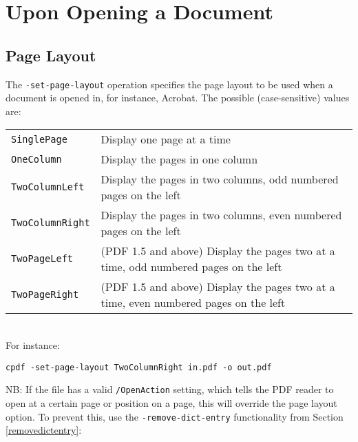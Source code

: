\documentclass{book}
\begin{document}
\section{Upon Opening a Document}

  \subsection{Page Layout}
  The \texttt{-set-page-layout} operation specifies the page layout to be used
when a document is opened in, for instance, Acrobat. The possible
(case-sensitive) values are:

\vspace{2mm}
  {\small\begin{tabular}{ll}
    \texttt{SinglePage} & \vspace{2mm} \parbox{8cm}{Display one page at a time} \\
    \texttt{OneColumn} & \vspace{2mm} \parbox{8cm}{Display the pages in one column} \\
    \texttt{TwoColumnLeft} & \vspace{2mm} \parbox{8cm}{Display the pages in two columns, odd numbered pages on the left} \\
    \texttt{TwoColumnRight} & \vspace{2mm} \parbox{8cm}{Display the pages in two columns, even numbered pages on the left} \\
    \texttt{TwoPageLeft} & \vspace{2mm} \parbox{8cm}{(PDF 1.5 and above) Display the pages two at a time, odd numbered pages on the left} \\
    \texttt{TwoPageRight} & \vspace{2mm} \parbox{8cm}{(PDF 1.5 and above) Display the pages two at a time, even numbered pages on the left}
  \end{tabular}}\\

  \noindent For instance:
  \begin{framed}
    \small\verb!cpdf -set-page-layout TwoColumnRight in.pdf -o out.pdf!
  \end{framed}
  
\noindent NB: If the file has a valid \texttt{/OpenAction} setting, which tells the PDF reader to open at a certain page or position on a page, this will override the page layout option. To prevent this, use the \texttt{-remove-dict-entry} functionality from Section \ref{removedictentry}:
\end{document}
